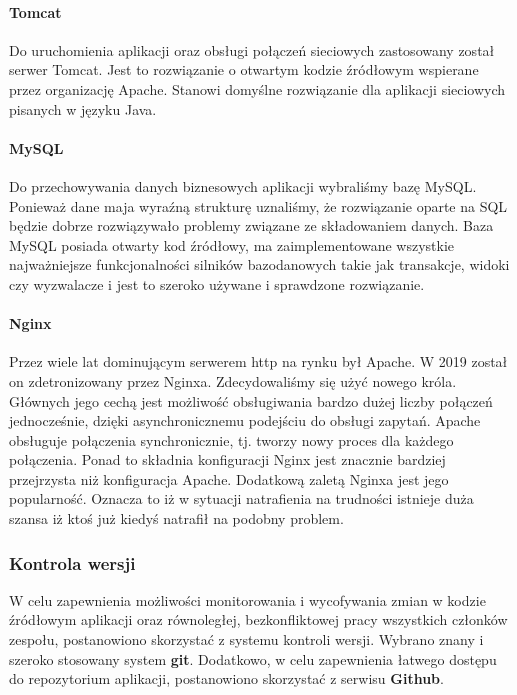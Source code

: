 \documentclass[10pt, titlepage, oneside, a4paper]{article}
\begin{document}
	\paragraph{Tomcat} \mbox{} \par
	Do uruchomienia aplikacji oraz obsługi połączeń sieciowych zastosowany został serwer Tomcat.
	Jest to rozwiązanie o otwartym kodzie źródłowym wspierane przez organizację Apache.
	Stanowi domyślne rozwiązanie dla aplikacji sieciowych pisanych w języku Java.

	\paragraph{MySQL} \mbox{} \par
	Do przechowywania danych biznesowych aplikacji wybraliśmy bazę MySQL.
	Ponieważ dane maja wyraźną strukturę uznaliśmy, że rozwiązanie oparte na SQL będzie dobrze rozwiązywało problemy związane ze składowaniem danych.
	Baza MySQL posiada otwarty kod źródłowy, ma zaimplementowane wszystkie najważniejsze funkcjonalności silników bazodanowych takie jak transakcje, widoki czy wyzwalacze i jest to szeroko używane i sprawdzone rozwiązanie.

	\paragraph{Nginx} \mbox{} \par
	Przez wiele lat dominującym serwerem http na rynku był Apache. W 2019 został on zdetronizowany przez Nginxa. 
	Zdecydowaliśmy się użyć nowego króla. Głównych jego cechą jest możliwość obsługiwania bardzo dużej liczby
	połączeń jednocześnie, dzięki asynchronicznemu podejściu do obsługi zapytań. Apache obsługuje połączenia
	synchronicznie, tj. tworzy nowy proces dla każdego połączenia. Ponad to składnia konfiguracji Nginx jest
	znacznie bardziej przejrzysta niż konfiguracja Apache. Dodatkową zaletą Nginxa jest jego popularność. Oznacza
	to iż w sytuacji natrafienia na trudności istnieje duża szansa iż ktoś już kiedyś natrafił na podobny problem.
	
	\subsubsection{Kontrola wersji}
	W celu zapewnienia możliwości monitorowania i wycofywania zmian w kodzie źródłowym aplikacji oraz równoległej, bezkonfliktowej pracy wszystkich członków zespołu, postanowiono skorzystać z systemu kontroli wersji. Wybrano znany i szeroko stosowany system \textbf{git}. Dodatkowo, w celu zapewnienia łatwego dostępu do repozytorium aplikacji, postanowiono skorzystać z serwisu \textbf{Github}.
	
\end{document}
